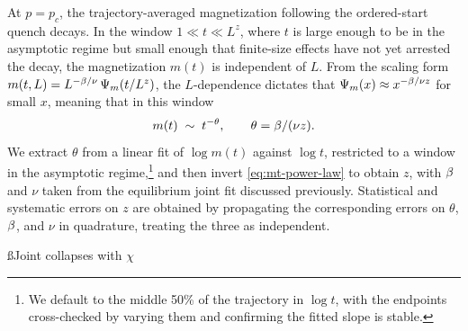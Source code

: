 \documentclass[pra,aps,twocolumn,groupedaddress,superscriptaddress,nofootinbib,preprintnumbers]{revtex4-2}
\begin{document}
\begin{widetext}
		
		At $p = p_c$, the trajectory-averaged magnetization following the
		ordered-start quench decays. In the window
		$1 \ll t \ll L^z$, where $t$ is large enough to be in the asymptotic
		regime but small enough that finite-size effects have not yet
		arrested the decay, the magnetization $m(t)$ is independent of $L$. From the scaling form $m(t,L) = L^{-\beta/\nu}\,\Psi_m(t/L^z)$, the $L$-dependence dictates that $\Psi_m(x) \approx x^{-\beta/\nu z}$ for small $x$,  meaning that in this window 
		\begin{equation}
			m(t) \;\sim\; t^{-\theta},
			\qquad
			\theta =\beta/(\nu z).
			\label{eq:mt-power-law}
		\end{equation}
		We extract $\theta$ from a linear fit of $\log m(t)$
		against $\log t$, restricted to a window in the asymptotic regime,\footnote{We default to the middle 50\% of the trajectory in $\log t$, with the
			endpoints cross-checked by varying them and confirming the fitted
			slope is stable.} and then invert \eqref{eq:mt-power-law} to obtain $z$, with $\beta$ and $\nu$ taken from the equilibrium joint fit discussed previously. Statistical and systematic
		errors on $z$ are obtained by propagating the corresponding errors
		on $\theta$, $\beta$, and $\nu$ in quadrature, treating the three as independent.
		
		\ss{Joint collapses with $\chi$}\label{ss:jointchi}
		

\end{widetext}
\end{document}
